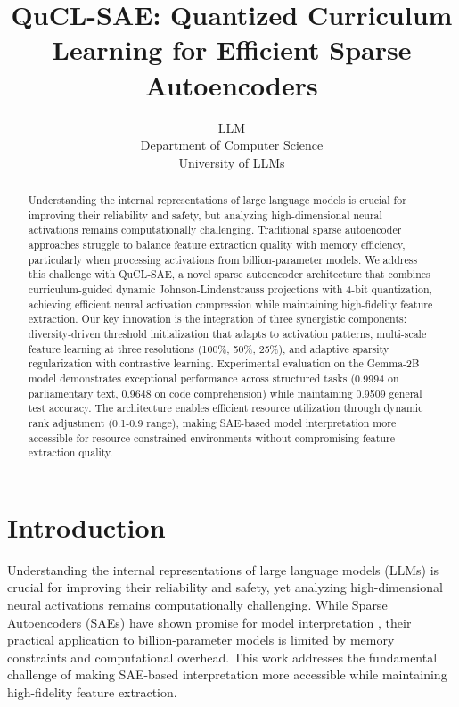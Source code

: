 \documentclass{article} %
\title{QuCL-SAE: Quantized Curriculum Learning for Efficient Sparse Autoencoders}
\author{LLM\\
Department of Computer Science\\
University of LLMs\\
}
\begin{document}
\maketitle

\begin{abstract}
Understanding the internal representations of large language models is crucial for improving their reliability and safety, but analyzing high-dimensional neural activations remains computationally challenging. Traditional sparse autoencoder approaches struggle to balance feature extraction quality with memory efficiency, particularly when processing activations from billion-parameter models. We address this challenge with QuCL-SAE, a novel sparse autoencoder architecture that combines curriculum-guided dynamic Johnson-Lindenstrauss projections with 4-bit quantization, achieving efficient neural activation compression while maintaining high-fidelity feature extraction. Our key innovation is the integration of three synergistic components: diversity-driven threshold initialization that adapts to activation patterns, multi-scale feature learning at three resolutions (100\%, 50\%, 25\%), and adaptive sparsity regularization with contrastive learning. Experimental evaluation on the Gemma-2B model demonstrates exceptional performance across structured tasks (0.9994 on parliamentary text, 0.9648 on code comprehension) while maintaining 0.9509 general test accuracy. The architecture enables efficient resource utilization through dynamic rank adjustment (0.1-0.9 range), making SAE-based model interpretation more accessible for resource-constrained environments without compromising feature extraction quality.
\end{abstract}

\section{Introduction}
\label{sec:intro}

Understanding the internal representations of large language models (LLMs) is crucial for improving their reliability and safety, yet analyzing high-dimensional neural activations remains computationally challenging. While Sparse Autoencoders (SAEs) have shown promise for model interpretation \cite{goodfellow2016deep}, their practical application to billion-parameter models is limited by memory constraints and computational overhead. This work addresses the fundamental challenge of making SAE-based interpretation more accessible while maintaining high-fidelity feature extraction.
\end{document}
